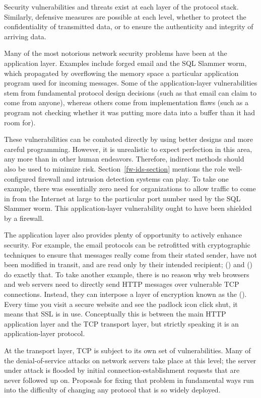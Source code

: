 Security vulnerabilities and threats exist at each layer of the
protocol stack.  Similarly, defensive measures are possible at each
level, whether to protect the confidentiality of transmitted data, or
to ensure the authenticity and integrity of arriving data.

Many of the most notorious network security problems have been at the
application layer.  Examples include forged email and the SQL Slammer
worm, which propagated by overflowing the memory space a particular
application program used for incoming messages.  Some of the
application-layer vulnerabilities stem from fundamental protocol
design decisions (such as that email can claim to come from anyone),
whereas others come from implementation flaws (such as a program not
checking whether it was putting more data into a buffer than it had
room for).

These vulnerabilities can be combated directly by using better
designs and more careful programming.  However, it is unrealistic to
expect perfection in this area, any more than in other human
endeavors.  Therefore, indirect methods should also be used to
minimize risk.  Section~\ref{fw-ids-section} mentions the role
well-configured firewall and intrusion detection systems can play.  To
take one example, there was essentially zero need for organizations to
allow traffic to come in from the Internet at large to the particular
port number used by the SQL Slammer worm.  This application-layer
vulnerability ought to have been shielded by a firewall.

The application layer also provides plenty of opportunity to actively
enhance security.  For example, the email protocols can be retrofitted
with cryptographic techniques to ensure that messages really come from
their stated sender, have not been modified in transit, and are
read only by their intended recipient;  () and  () do
exactly that.  To take another example, there is no reason why web
browsers and web servers need to directly send HTTP messages over
vulnerable TCP connections.  Instead, they can interpose a layer of
encryption known as the  ().
Every time you visit a secure website and see the padlock icon click
shut, it means that SSL is in use.  Conceptually this is between the
main HTTP application layer and the TCP transport layer, but strictly
speaking it is an application-layer protocol.

At the transport layer, TCP is subject to its own set of
vulnerabilities.  Many of the denial-of-service attacks on network
servers take place at this level; the server under attack is flooded
by initial connection-establishment requests that are never followed
up on.  Proposals for
fixing that problem in fundamental ways run into the difficulty of
changing any protocol that is so widely deployed.

